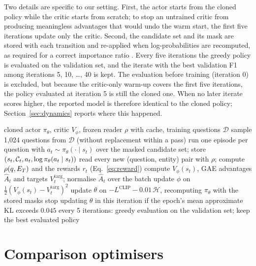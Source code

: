 Two details are specific to our setting. First, the actor starts from the cloned policy while the critic starts from scratch; to stop an untrained critic from producing meaningless advantages that would undo the warm start, the first five iterations update only the critic. Second, the candidate set and its mask are stored with each transition and re-applied when log-probabilities are recomputed, as required for a correct importance ratio \citep{huang2022closer}. Every five iterations the greedy policy is evaluated on the validation set, and the iterate with the best validation F1 among iterations 5, 10, \ldots, 40 is kept. The evaluation before training (iteration 0) is excluded, but because the critic-only warm-up covers the first five iterations, the policy evaluated at iteration 5 is still the cloned one. When no later iterate scores higher, the reported model is therefore identical to the cloned policy; Section~\ref{sec:dynamics} reports where this happened.

\begin{algorithm}[t]
\caption{PPO for entity selection (one seed)}
\label{alg:ppo}
\begin{algorithmic}[1]
\Require cloned actor $\pi_\theta$, critic $V_\phi$, frozen reader $\rho$ with cache, training questions $\mathcal{D}$
  \State sample 1{,}024 questions from $\mathcal{D}$ (without replacement within a pass)
  \State run one episode per question with $a_t\sim\pi_\theta(\cdot\mid s_t)$ over the masked candidate set; store $(s_t,\mathcal{C}_t,a_t,\log\pi_\theta(a_t\mid s_t))$
  \State read every new (question, entity) pair with $\rho$; compute $\rho(q,E_T)$ and the rewards $r_t$ (Eq.~\ref{eq:reward})
  \State compute $V_\phi(s_t)$, GAE advantages $\hat A_t$ and targets $V^{\mathrm{targ}}_t$; normalise $\hat A_t$ over the batch
      \State update $\phi$ on $\tfrac12(V_\phi(s_t)-V^{\mathrm{targ}}_t)^2$
        \State update $\theta$ on $-L^{\mathrm{CLIP}}-0.01\,\mathcal{H}$, recomputing $\pi_\theta$ with the stored masks
      \EndIf
    \EndFor
    \State stop updating $\theta$ in this iteration if the epoch's mean approximate KL exceeds $0.045$
  \EndFor
  \State every 5 iterations: greedy evaluation on the validation set; keep the best evaluated policy
\EndFor
\end{algorithmic}
\end{algorithm}

\section{Comparison optimisers}
\label{sec:otheralgos}

